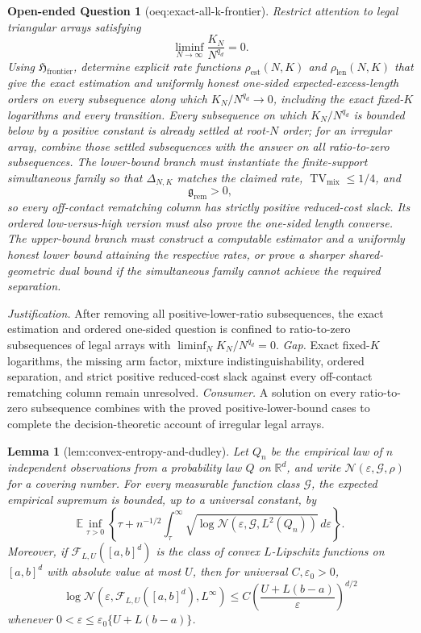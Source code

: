 \documentclass{article}
\newtheorem{lemma}{Lemma}
\newtheorem{openendedquestion}{Open-ended Question}
\begin{document}
\begin{openendedquestion}[oeq:exact-all-k-frontier]\label{oeq:exact-all-k-frontier}
Restrict attention to legal triangular arrays satisfying
\[
\liminf_{N\to\infty}\frac{K_N}{N^{q_d}}=0.
\]
Using \(\mathfrak H_{\mathrm{frontier}}\), determine explicit rate functions \(\rho_{\mathrm{est}}(N,K)\) and \(\rho_{\mathrm{len}}(N,K)\) that give the exact estimation and uniformly honest one-sided expected-excess-length orders on every subsequence along which \(K_N/N^{q_d}\to0\), including the exact fixed-\(K\) logarithms and every transition.  Every subsequence on which \(K_N/N^{q_d}\) is bounded below by a positive constant is already settled at root-\(N\) order; for an irregular array, combine those settled subsequences with the answer on all ratio-to-zero subsequences.  The lower-bound branch must instantiate the finite-support simultaneous family so that \(\Delta_{N,K}\) matches the claimed rate, \(\operatorname{TV}_{\mathrm{mix}}\le1/4\), and
\[
\mathfrak g_{\mathrm{rem}}>0,
\]
so every off-contact rematching column has strictly positive reduced-cost slack.  Its ordered low-versus-high version must also prove the one-sided length converse.  The upper-bound branch must construct a computable estimator and a uniformly honest lower bound attaining the respective rates, or prove a sharper shared-geometric dual bound if the simultaneous family cannot achieve the required separation.
\end{openendedquestion}
\par\smallskip\noindent \textit{Justification.} After removing all positive-lower-ratio subsequences, the exact estimation and ordered one-sided question is confined to ratio-to-zero subsequences of legal arrays with \(\liminf_NK_N/N^{q_d}=0\). \textit{Gap.} Exact fixed-\(K\) logarithms, the missing arm factor, mixture indistinguishability, ordered separation, and strict positive reduced-cost slack against every off-contact rematching column remain unresolved. \textit{Consumer.} A solution on every ratio-to-zero subsequence combines with the proved positive-lower-bound cases to complete the decision-theoretic account of irregular legal arrays.

\begin{lemma}[lem:convex-entropy-and-dudley]\label{lem:convex-entropy-and-dudley}
Let \(Q_n\) be the empirical law of \(n\) independent observations from a probability law \(Q\) on \(\mathbb R^d\), and write \(\mathcal N(\varepsilon,\mathcal G,\rho)\) for a covering number. For every measurable function class \(\mathcal G\), the expected empirical supremum is bounded, up to a universal constant, by
\[
\mathbb E\inf_{\tau>0}\left\{\tau+n^{-1/2}\int_\tau^\infty
\sqrt{\log \mathcal N(\varepsilon,\mathcal G,L^2(Q_n))}\,d\varepsilon\right\}.
\]
Moreover, if \(\mathcal F_{L,U}([a,b]^d)\) is the class of convex \(L\)-Lipschitz functions on \([a,b]^d\) with absolute value at most \(U\), then for universal \(C,\varepsilon_0>0\),
\[
\log \mathcal N\!\left(\varepsilon,\mathcal F_{L,U}([a,b]^d),L^\infty\right)
\le C\left(\frac{U+L(b-a)}{\varepsilon}\right)^{d/2}
\]
whenever \(0<\varepsilon\le\varepsilon_0\{U+L(b-a)\}\).
\end{lemma}
\end{document}
